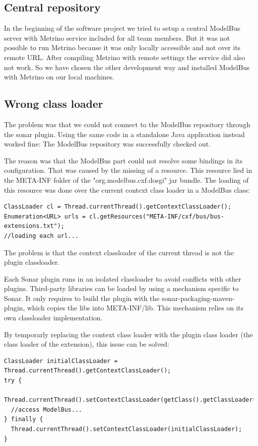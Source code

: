 \subsection{Central repository}
In the beginning of the software project we tried to setup a central
ModelBus server with Metrino service included for all team
members. But it was not possible to run Metrino because it was only
locally accessible and not over its remote URL. After compiling
Metrino with remote settings the service did also not work. So we have
chosen the other development way and installed ModelBus with Metrino
on our local machines.
		
\subsection{Wrong class loader}
The problem was that we could not connect to the ModelBus repository
through the sonar plugin. Using the same code in a standalone Java
application instead worked fine: The ModelBus repository was
successfully checked out.

The reason was that the ModelBus part could not resolve some bindings
in its configuration. That was caused by the missing of a
resource. This resource lied in the META-INF folder of the
"org.modelbus.cxf.dosgi" jar bundle. The loading of this resource was
done over the current context class loader in a ModelBus class:

\begin{verbatim}
ClassLoader cl = Thread.currentThread().getContextClassLoader();
Enumeration<URL> urls = cl.getResources("META-INF/cxf/bus/bus-extensions.txt");
//loading each url...
\end{verbatim}

The problem is that the context classloader of the current thread is
not the plugin classloader.

Each Sonar plugin runs in an isolated classloader to avoid conflicts
with other plugins. Third-party libraries can be loaded by using a
mechanism specific to Sonar. It only requires to build the plugin with
the sonar-packaging-maven-plugin, which copies the libs into
META-INF/lib. This mechanism relies on its own classloader
implementation.

By temporarly replacing the context class loader with the plugin class loader (the class loader of the extension), this issue can be solved:
\begin{verbatim}
ClassLoader initialClassLoader = Thread.currentThread().getContextClassLoader();
try {
  Thread.currentThread().setContextClassLoader(getClass().getClassLoader());
  //access ModelBus...
} finally {
  Thread.currentThread().setContextClassLoader(initialClassLoader);
}
\end{verbatim}

